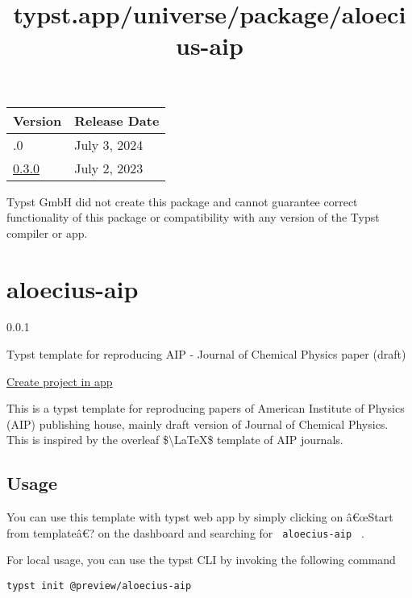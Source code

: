 \begin{longtable}[]{@{}ll@{}}
\toprule\noalign{}
Version & Release Date \\
\midrule\noalign{}
\endhead
\bottomrule\noalign{}
\endlastfoot
0.4.0 & July 3, 2024 \\
\href{https://typst.app/universe/package/splash/0.3.0/}{0.3.0} & July 2,
2023 \\
\end{longtable}

Typst GmbH did not create this package and cannot guarantee correct
functionality of this package or compatibility with any version of the
Typst compiler or app.


\title{typst.app/universe/package/aloecius-aip}

\label{banner}
\label{template-thumbnail}

\section{aloecius-aip}\label{aloecius-aip}

{ 0.0.1 }

Typst template for reproducing AIP - Journal of Chemical Physics paper
(draft)

\href{/app?template=aloecius-aip&version=0.0.1}{Create project in app}

\label{readme}
This is a typst template for reproducing papers of American Institute of
Physics (AIP) publishing house, mainly draft version of Journal of
Chemical Physics. This is inspired by the overleaf
\$\textbackslash LaTeX\$ template of AIP journals.

\subsection{Usage}\label{usage}

You can use this template with typst web app by simply clicking on
â€œStart from templateâ€? on the dashboard and searching for
\texttt{\ aloecius-aip\ } .

For local usage, you can use the typst CLI by invoking the following
command

\begin{verbatim}
typst init @preview/aloecius-aip
\end{verbatim}

